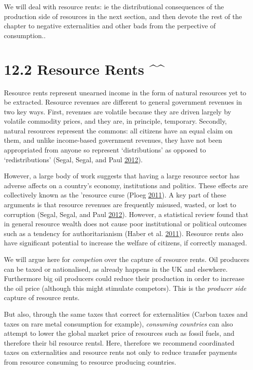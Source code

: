 \documentclass[]{tufte-handout}
\begin{document}
We will deal with resource rents: ie the distributional consequences of
the production side of resources in the next section, and then devote
the rest of the chapter to negative externalities and other bads from
the perpective of consumption..

\hypertarget{resource-rents}{%
\section{12.2 Resource Rents \^{}\^{}}\label{resource-rents}}

Resource rents represent unearned income in the form of natural
resources yet to be extracted. Resource revenues are different to
general government revenues in two key ways. First, revenues are
volatile because they are driven largely by volatile commodity prices,
and they are, in principle, temporary. Secondly, natural resources
represent the commons: all citizens have an equal claim on them, and
unlike income-based government revenues, they have not been appropriated
from anyone so represent `distributions' as opposed to `redistributions'
(Segal, Segal, and Paul \protect\hyperlink{ref-Segal2012}{2012}).

However, a large body of work suggests that having a large resource
sector has adverse affects on a country's economy, institutions and
politics. These effects are collectively known as the 'resource curse
(Ploeg \protect\hyperlink{ref-Ploeg2011}{2011}). A key part of these
arguments is that resource revenues are frequently misused, wasted, or
lost to corruption (Segal, Segal, and Paul
\protect\hyperlink{ref-Segal2012}{2012}). However, a statistical review
found that in general resource wealth does not cause poor institutional
or political outcomes such as a tendency for authoritarianism (Haber et
al. \protect\hyperlink{ref-Haber2011}{2011}). Resource rents also have
significant potential to increase the welfare of citizens, if correctly
managed.

We will argue here for \emph{competion} over the capture of resource
rents. Oil producers can be taxed or nationalised, as already happens in
the UK and elsewhere. Furthermore big oil producers could reduce their
production in order to increase the oil price (although this might
stimulate competors). This is the \emph{producer side} capture of
resource rents.

But also, through the same taxes that correct for externalities (Carbon
taxes and taxes on rare metal consumption for example), \emph{consuming
countries} can also attempt to lower the global market price of
resources such as fossil fuels, and therefore their bil resource rentsl.
Here, therefore we recommend coordinated taxes on externalities and
resource rents not only to reduce transfer payments from resource
consuming to resource producing countries.
\end{document}
